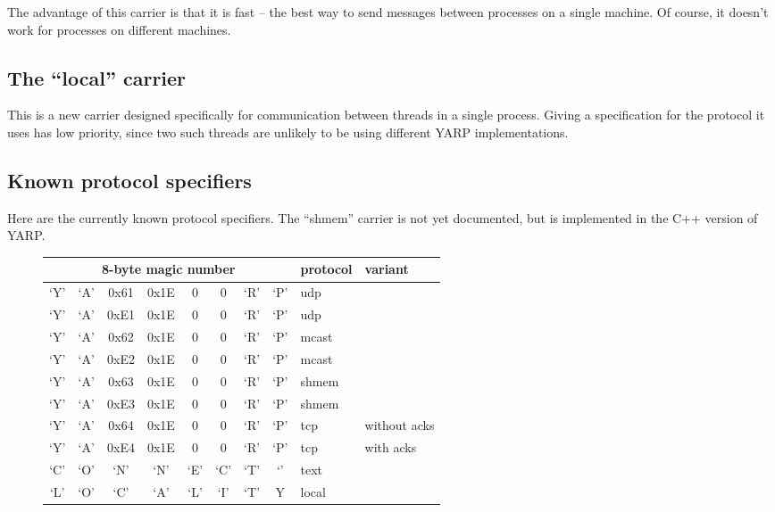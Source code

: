 \documentclass[a4]{article}
\begin{document}
The advantage of this carrier is that it is fast -- the best way to
send messages between processes on a single machine.  Of course, it
doesn't work for processes on different machines.


\subsection{The ``local'' carrier}

This is a new carrier designed specifically for communication between
threads in a single process.  Giving a specification for the protocol
it uses has low priority, since two such threads are unlikely to be
using different YARP implementations.


\subsection{Known protocol specifiers}

Here are the currently known protocol specifiers.
The ``shmem'' carrier is not yet documented, but is
implemented in the C++ version of YARP.

\begin{figure}[h]
\begin{tabular}{|cccccccc|l|l|}
\hline
\multicolumn{8}{|c|}{\bf 8-byte magic number} & {\bf protocol} & {\bf variant} \\ \hline\hline
`Y' & `A' & 0x61 & 0x1E & 0 & 0 & `R' & `P'  & udp & \\
`Y' & `A' & 0xE1 & 0x1E & 0 & 0 & `R' & `P'  & udp & \\
`Y' & `A' & 0x62 & 0x1E & 0 & 0 & `R' & `P'  & mcast & \\
`Y' & `A' & 0xE2 & 0x1E & 0 & 0 & `R' & `P'  & mcast & \\
`Y' & `A' & 0x63 & 0x1E & 0 & 0 & `R' & `P'  & shmem & \\
`Y' & `A' & 0xE3 & 0x1E & 0 & 0 & `R' & `P'  & shmem & \\
`Y' & `A' & 0x64 & 0x1E & 0 & 0 & `R' & `P'  & tcp & without acks \\
`Y' & `A' & 0xE4 & 0x1E & 0 & 0 & `R' & `P'  & tcp & with acks \\
`C' & `O' & `N'  & `N'  & `E' & `C' & `T' & `\textvisiblespace{}'  & text & \\
`L' & `O' & `C'  & `A'  & `L' & `I' & `T' & Y  & local & \\
\hline
\end{tabular}
\end{figure}
\end{document}
